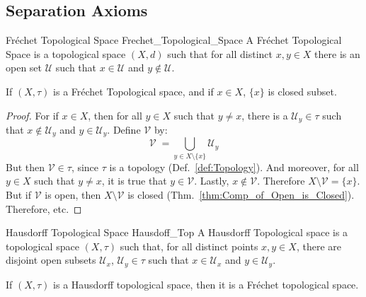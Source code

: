         \subsection{Separation Axioms}
        \begin{ldefinition}{Fr\'{e}chet Topological Space}
              {Frechet_Topological_Space}
            A Fr\'{e}chet Topological Space is a topological
            space $(X,d)$ such that for all distinct $x,y\in{X}$
            there is an open set $\mathcal{U}$ such that
            $x\in\mathcal{U}$ and $y\notin\mathcal{U}$.
        \end{ldefinition}
        \begin{theorem}
            If $(X,\tau)$ is a Fr\'{e}chet Topological space, and
            if $x\in{X}$, $\{x\}$ is closed subset.
        \end{theorem}
        \begin{proof}
            For if $x\in{X}$, then for all $y\in{X}$ such that
            $y\ne{x}$, there is a $\mathcal{U}_{y}\in\tau$ such
            that $x\notin\mathcal{U}_{y}$ and $y\in\mathcal{U}_{y}$.
            Define $\mathcal{V}$ by:
            \begin{equation}
                \mathcal{V}\;=
                \bigcup_{y\in{X}\setminus\{x\}}\mathcal{U}_{y}
            \end{equation}
            But then $\mathcal{V}\in\tau$, since $\tau$ is a
            topology (Def.~\ref{def:Topology}). And moreover, for
            all $y\in{X}$ such that $y\ne{x}$, it is true that
            $y\in\mathcal{V}$. Lastly, $x\notin\mathcal{V}$.
            Therefore $X\setminus\mathcal{V}=\{x\}$. But if
            $\mathcal{V}$ is open, then $X\setminus\mathcal{V}$ is
            closed (Thm.~\ref{thm:Comp_of_Open_is_Closed}).
            Therefore, etc.
        \end{proof}
        \begin{ldefinition}{Hausdorff Topological Space}
              {Hausdoff_Top}
            A Hausdorff Topological space is a topological space
            $(X,\tau)$ such that, for all distinct points
            $x,y\in{X}$, there are disjoint open subsets
            $\mathcal{U}_{x}$, $\mathcal{U}_{y}\in\tau$ such that
            $x\in\mathcal{U}_{x}$ and $y\in\mathcal{U}_{y}$.
        \end{ldefinition}
        \begin{theorem}
            If $(X,\tau)$ is a Hausdorff topological space, then
            it is a Fr\'{e}chet topological space.
        \end{theorem}
